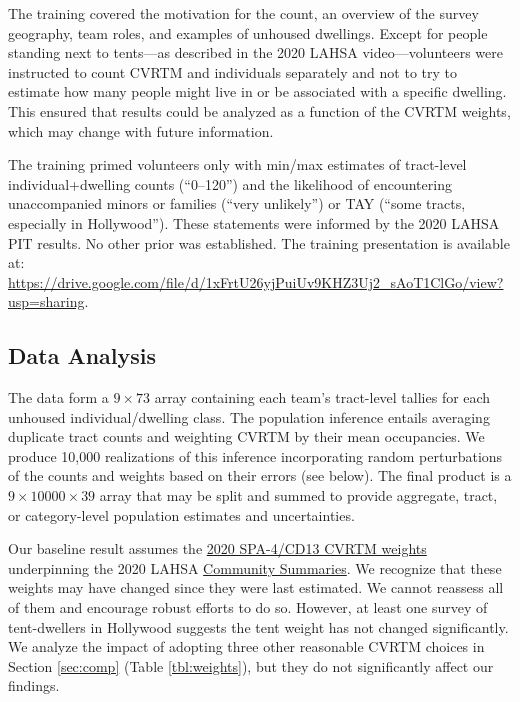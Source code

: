 \documentclass[11pt,twocolumn]{article}
\def\Count{count}
\begin{document}
The training covered the motivation for the \Count, an overview of the survey geography, team roles, 
and examples of unhoused dwellings. Except for people standing next to tents---as described 
in the 2020 LAHSA video---volunteers were instructed to count CVRTM and individuals separately 
and not to try to estimate how many people might live in or be associated with a specific dwelling. 
This ensured that results could be analyzed as a function of the CVRTM weights, which may change 
with future information.%

The training primed volunteers only with min/max estimates of tract-level individual+dwelling 
counts (``0--120'') and the likelihood of encountering unaccompanied minors or families (``very unlikely'')
or TAY (``some tracts, especially in Hollywood''). These statements were informed by the 2020 
LAHSA PIT results. No other prior was established. The training presentation is available 
at: \url{https://drive.google.com/file/d/1xFrtU26yjPuiUv9KHZ3Uj2_sAoT1ClGo/view?usp=sharing}.

\subsection{Data Analysis}
\label{sec:analysis}

The data form a $9\times73$ array containing each team's tract-level tallies for each unhoused 
individual/dwelling class. The population inference entails averaging duplicate tract counts and 
weighting CVRTM by their mean occupancies. We produce 10,000 realizations of this inference 
incorporating random perturbations of the counts and weights based on their 
errors (see below). The final product is a $9\times10000\times39$ array that may be split and 
summed to provide aggregate, tract, or category-level population estimates and uncertainties.

Our baseline result assumes the 
\href{https://www.lahsa.org/documents?id=4635-usc-2018-2020-multipliers-and-estimates-overview.pdf}
{2020 SPA-4/CD13 CVRTM weights} underpinning the 2020 LAHSA 
\href{https://www.lahsa.org/documents?id=4686-2020-greater-los-angeles-city-community-homelessness-report-service-planning-area-4.pdf}{Community Summaries}. We recognize that these weights may have changed since they were last
estimated. We cannot reassess all of them and encourage robust efforts to do so. However, at 
least one survey of tent-dwellers in Hollywood suggests the tent weight has not changed 
significantly. We analyze the impact of adopting three other reasonable CVRTM choices in 
Section \ref{sec:comp} (Table \ref{tbl:weights}), but they do not significantly affect our findings.
\end{document}

